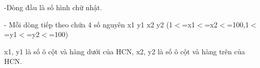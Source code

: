 -Dòng đầu là số hình chữ nhật.

- Mỗi dòng tiếp theo chứa 4 số nguyên x1 y1 x2 y2 (1$<$=x1$<$=x2$<$=100,1$<$=y1$<$=y2$<$=100)

x1, y1 là số ô cột và hàng dưới của HCN, x2, y2 là số ô cột và hàng trên của HCN.